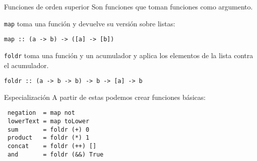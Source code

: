 \begin{frame}[fragile]{Funciones de orden superior}
  Son funciones que toman funciones como argumento.

  \espacio

  \texttt{map} toma una función y devuelve su versión sobre listas:
  \begin{lstlisting}
map :: (a -> b) -> ([a] -> [b])
  \end{lstlisting}

  \espacio
  
  \texttt{foldr} toma una función y un acumulador
  y aplica los elementos de la lista contra el acumulador.
  \begin{lstlisting}
foldr :: (a -> b -> b) -> b -> [a] -> b
  \end{lstlisting}

\end{frame}

\begin{frame}[fragile]{Especialización}
  A partir de estas podemos crear funciones básicas:

  \espacio

  \begin{lstlisting}
 negation  = map not
 lowerText = map toLower
 sum       = foldr (+) 0
 product   = foldr (*) 1
 concat    = foldr (++) []
 and       = foldr (&&) True
  \end{lstlisting}
  \espacio

\end{frame}
